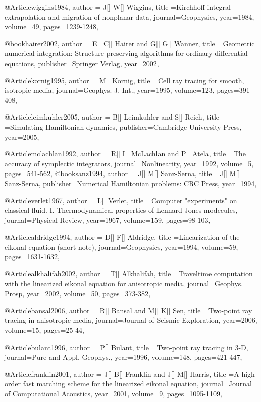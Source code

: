 @Article{wiggins1984,
  author = {J[] W[] Wiggins},
  title ={Kirchhoff integral extrapolation and migration of nonplanar data},
  journal={Geophysics},
  year=1984,
  volume=49,
  pages={1239-1248},
}

@book{hairer2002,
  author = {E[] C[] Hairer and G[] G[] Wanner},
  title ={Geometric numerical integration: Structure preserving algorithms for ordinary differential equations},
  publisher={Springer Verlag},
  year=2002,
}

@Article{kornig1995,
  author = {M[] Kornig},
  title ={Cell ray tracing for smooth, isotropic media},
  journal={Geophys. J. Int.},
  year=1995,
  volume=123,
  pages={391-408},
}

@Article{leimkuhler2005,
  author = {B[] Leimkuhler and S[] Reich},
  title ={Simulating Hamiltonian dynamics},
  publisher={Cambridge University Press},
  year=2005,
}


@Article{mclachlan1992,
  author = {R[] I[] McLachlan and P[] Atela},
  title ={The accuracy of symplectic integrators},
  journal={Nonlinearity},
  year=1992,
  volume=5,
  pages={541-562},
}
@book{sanz1994,
  author = {J[] M[] Sanz-Serna},
  title ={J[] M[] Sanz-Serna},
  publisher={Numerical Hamiltonian problems: CRC Press},
  year=1994,
}

@Article{verlet1967,
  author = {L[] Verlet},
  title ={Computer "experiments" on classical fluid. I. Thermodynamical properties of Lennard-Jones modecules},
  journal={Physical Review},
  year=1967,
  volume=159,
  pages={98-103},
}


@Article{aldridge1994,
  author = {D[] F[] Aldridge},
  title ={Linearization of the eikonal equation (short note)},
  journal={Geophysics},
  year=1994,
  volume=59,
  pages={1631-1632},
}

@Article{alkhalifah2002,
  author = {T[] Alkhalifah},
  title ={Traveltime computation with the linearized eikonal equation for anisotropic media},
  journal={Geophys. Prosp},
  year=2002,
  volume=50,
  pages={373-382},
}

@Article{bansal2006,
  author = {R[] Bansal and M[] K[] Sen},
  title ={Two-point ray tracing in anisotropic media},
  journal={Journal of Seismic Exploration},
  year=2006,
  volume=15,
  pages={25-44},
}

@Article{bulant1996,
  author = {P[] Bulant},
  title ={Two-point ray tracing in 3-D},
  journal={Pure and Appl. Geophys.},
  year=1996,
  volume=148,
  pages={421-447},
}


@Article{franklin2001,
  author = {J[] B[] Franklin and J[] M[] Harris},
  title ={A high-order fast marching scheme for the linearized eikonal equation},
  journal={Journal of Computational Acoustics},
  year=2001,
  volume=9,
  pages={1095-1109},
}

